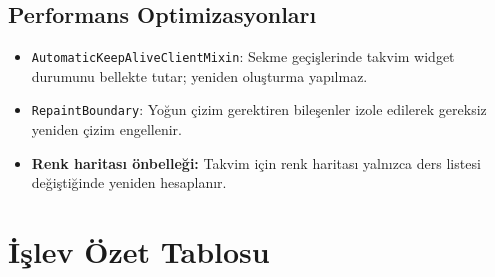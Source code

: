 \documentclass[12pt,a4paper]{article}
\begin{document}
\subsection{Performans Optimizasyonları}

\begin{itemize}
    \item \texttt{AutomaticKeepAliveClientMixin}: Sekme geçişlerinde takvim widget durumunu bellekte tutar; yeniden oluşturma yapılmaz.
    \item \texttt{RepaintBoundary}: Yoğun çizim gerektiren bileşenler izole edilerek gereksiz yeniden çizim engellenir.
    \item \textbf{Renk haritası önbelleği:} Takvim için renk haritası yalnızca ders listesi değiştiğinde yeniden hesaplanır.
\end{itemize}

\section{İşlev Özet Tablosu}
\end{document}
